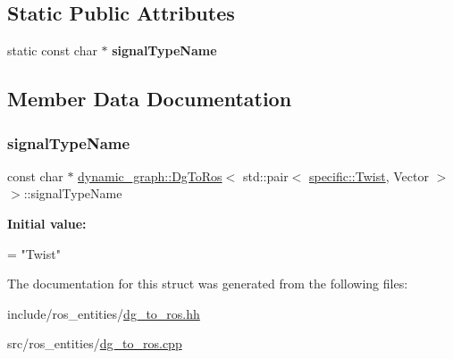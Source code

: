 \subsection*{Static Public Attributes}
\begin{DoxyCompactItemize}
\item 
static const char $\ast$ {\bfseries signal\+Type\+Name}
\end{DoxyCompactItemize}


\subsection{Member Data Documentation}
\mbox{\label{structdynamic__graph_1_1DgToRos_3_01std_1_1pair_3_01specific_1_1Twist_00_01Vector_01_4_01_4_aaa82322e928e53346078a615a0562f3e}} 
\subsubsection{\texorpdfstring{signal\+Type\+Name}{signalTypeName}}
{\footnotesize\ttfamily const char $\ast$ \hyperlink{classdynamic__graph_1_1DgToRos}{dynamic\+\_\+graph\+::\+Dg\+To\+Ros}$<$ std\+::pair$<$ \hyperlink{classdynamic__graph_1_1specific_1_1Twist}{specific\+::\+Twist}, Vector $>$ $>$\+::signal\+Type\+Name\hspace{0.3cm}{\ttfamily [static]}}

{\bfseries Initial value\+:}
\begin{DoxyCode}
=
    \textcolor{stringliteral}{"Twist"}
\end{DoxyCode}


The documentation for this struct was generated from the following files\+:\begin{DoxyCompactItemize}
\item 
include/ros\+\_\+entities/\hyperlink{dg__to__ros_8hh}{dg\+\_\+to\+\_\+ros.\+hh}\item 
src/ros\+\_\+entities/\hyperlink{dg__to__ros_8cpp}{dg\+\_\+to\+\_\+ros.\+cpp}\end{DoxyCompactItemize}
